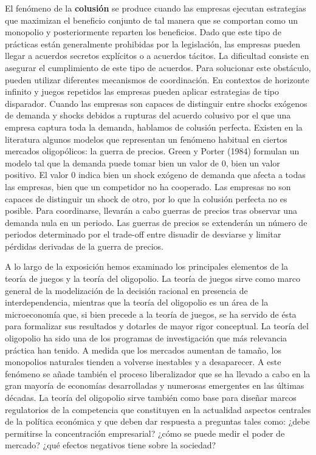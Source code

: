 \documentclass{nuevotema}
\begin{document}
El fenómeno de la \textbf{colusión} se produce cuando las empresas ejecutan estrategias que maximizan el beneficio conjunto de tal manera que se comportan como un monopolio y posteriormente reparten los beneficios. Dado que este tipo de prácticas están generalmente prohibidas por la legislación, las empresas pueden llegar a acuerdos secretos explícitos o a acuerdos tácitos. La dificultad consiste en asegurar el cumplimiento de este tipo de acuerdos. Para solucionar este obstáculo, pueden utilizar diferentes mecanismos de coordinación. En contextos de horizonte infinito y juegos repetidos las empresas pueden aplicar estrategias de tipo disparador. Cuando las empresas son capaces de distinguir entre shocks exógenos de demanda y shocks debidos a rupturas del acuerdo colusivo por el que una empresa captura toda la demanda, hablamos de colusión perfecta. Existen en la literatura algunos modelos que representan un fenómeno habitual en ciertos mercados oligopólicos: la guerra de precios. Green y Porter (1984) formulan un modelo tal que la demanda puede tomar bien un valor de 0, bien un valor positivo. El valor 0 indica bien un shock exógeno de demanda que afecta a todas las empresas, bien que un competidor no ha cooperado. Las empresas no son capaces de distinguir un shock de otro, por lo que la colusión perfecta no es posible. Para coordinarse, llevarán a cabo guerras de precios tras observar una demanda nula en un periodo. Las guerras de precios se extenderán un número de periodos determinado por el trade-off entre disuadir de desviarse y limitar pérdidas derivadas de la guerra de precios. 

A lo largo de la exposición hemos examinado los principales elementos de la teoría de juegos y la teoría del oligopolio. La teoría de juegos sirve como marco general de la modelización de la decisión racional en presencia de interdependencia, mientras que la teoría del oligopolio es un área de la microeconomía que, si bien precede a la teoría de juegos, se ha servido de ésta para formalizar sus resultados y dotarles de mayor rigor conceptual. La teoría del oligopolio ha sido una de los programas de investigación que más relevancia práctica han tenido. A medida que los mercados aumentan de tamaño, los monopolios naturales tienden a volverse inestables y a desaparecer. A este fenómeno se añade también el proceso liberalizador que se ha llevado a cabo en la gran mayoría de economías desarrolladas y numerosas emergentes en las últimas décadas. La teoría del oligopolio sirve también como base para diseñar marcos regulatorios de la competencia que constituyen en la actualidad aspectos centrales de la política económica y que deben dar respuesta a preguntas tales como: ¿debe permitirse la concentración empresarial? ¿cómo se puede medir el poder de mercado? ¿qué efectos negativos tiene sobre la sociedad?
\end{document}
